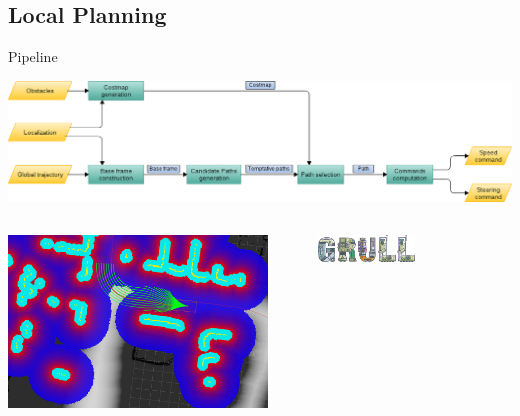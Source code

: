 \graphicspath{
  {./images/bmps/}{./images/vects/}{./images/}
  {./images/presentation/bmps/}{./images/presentation/vects/}{./images/presentation/}
  {./images/chapter00/bmps/}{./images/chapter00/vects/}{./images/chapter00/}
  {./images/chapter07/bmps/}{./images/chapter07/vects/}{./images/chapter07/}
}

\subsection{Local Planning}

\begin{frame}{Pipeline}
  \vspace{-0.5cm}
  \begin{center}
    \includegraphics[width=\textwidth]{pipeline_cp07}
  \end{center}
  \begin{columns}[c] %
    \includegraphics[width=0.9\textwidth]{example14}
    \begin{center}
      \includegraphics[width=0.5\textwidth]{grull}
    \end{center}
  \end{columns}

  \note {

  }
\end{frame}

